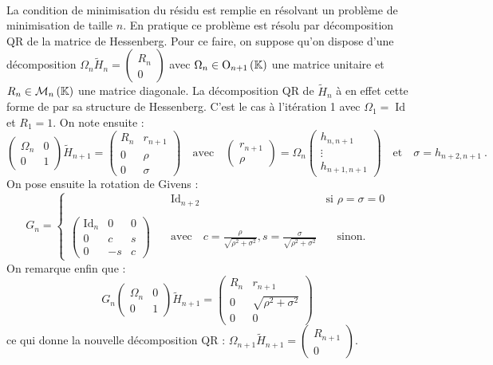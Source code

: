 	\paragraph{}
	La condition de minimisation du résidu est remplie en résolvant un problème de minimisation de taille $n$.
	En pratique ce problème est résolu par décomposition QR de la matrice de Hessenberg.
	Pour ce faire, on suppose qu'on dispose d'une décomposition $\Omega_n\widetilde{H}_n = \begin{pmatrix}R_n \\ 0\end{pmatrix}$ avec $\Omega_n\in\operatorname{O}_{n+1}\left(\mathbb{K}\right)$ une matrice unitaire et $R_n\in\mathcal{M}_{n}\left(\mathbb{K}\right)$ une matrice diagonale.
	La décomposition QR de $\widetilde{H}_n$ à en effet cette forme de par sa structure de Hessenberg.
	C'est le cas à l'itération 1 avec $\Omega_1 = \operatorname{Id}$ et $R_1 = 1$.
	On note ensuite :
	\[\begin{pmatrix}\Omega_n & 0 \\ 0 & 1\end{pmatrix}\widetilde{H}_{n+1} = \begin{pmatrix}R_n & r_{n+1} \\ 0 & \rho \\ 0 & \sigma\end{pmatrix} \quad\textrm{avec}\quad \begin{pmatrix}r_{n+1} \\ \rho\end{pmatrix} = \Omega_n\begin{pmatrix}h_{n,n+1} \\ \vdots \\ h_{n+1,n+1}\end{pmatrix} \quad\textrm{et}\quad \sigma = h_{n+2,n+1}\ .\]
	On pose ensuite la rotation de Givens :
	\[G_n = \left\{\begin{aligned}
		&\quad\operatorname{Id}_{n+2} &\textrm{si }\rho = \sigma = 0\\ \\
		\begin{pmatrix}\operatorname{Id}_n & 0 & 0 \\ 0 & c & s \\ 0 & -s & c\end{pmatrix}& \quad\textrm{avec}\quad c = \frac{\rho}{\sqrt{\rho^2 + \sigma^2}}, s = \frac{\sigma}{\sqrt{\rho^2 + \sigma^2}} &\quad\textrm{sinon.}
	\end{aligned}\right.\]
	On remarque enfin que :
	\[G_n\begin{pmatrix}\Omega_n & 0 \\ 0 & 1\end{pmatrix}\widetilde{H}_{n+1} = \begin{pmatrix}R_n & r_{n+1} \\ 0 & \sqrt{\rho^2 + \sigma^2} \\ 0 & 0\end{pmatrix}\]
	ce qui donne la nouvelle décomposition QR : $\Omega_{n+1}\widetilde{H}_{n+1} = \begin{pmatrix}R_{n+1} \\ 0\end{pmatrix}$.



